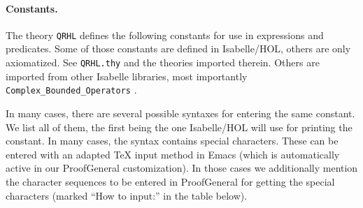 \documentclass{article}
\begin{document}
\paragraph{Constants.} The theory \texttt{QRHL} defines the following
constants for use in expressions and predicates.
Some of those constants are defined in Isabelle/HOL, others are only axiomatized.
See \texttt{QRHL.thy} and the theories imported therein.
Others are imported from other Isabelle libraries, most importantly \texttt{Complex\_Bounded\_Operators} \cite{bounded-operators}.

In many cases, there
are several possible syntaxes for entering the same constant. We list
all of them, the first being the one Isabelle/HOL will use for
printing the constant. In many cases, the syntax contains special
characters. These can be entered with an adapted TeX input method in Emacs
(which is automatically active in our ProofGeneral customization). In
those cases we additionally mention the character sequences to be entered in ProofGeneral
for getting the special characters (marked ``How to input:'' in the table below).

\newcommand\constdef[3]{#1\par
  \hskip1em\begin{minipage}{\hsize-1em}\raggedright $::#2$\end{minipage}%
  \ifx!#3!\hskip-1em\noindent\else\par\medskip\small(for #3)\fi}

\newcommand\subhead[1]{\multicolumn{2}{r@{}}{\footnotesize\bfseries #1}\\}

\newcommand\toolconst[1]{\index{#1@\textttOLD{#1} (Isabelle/HOL constant)}}
\end{document}
